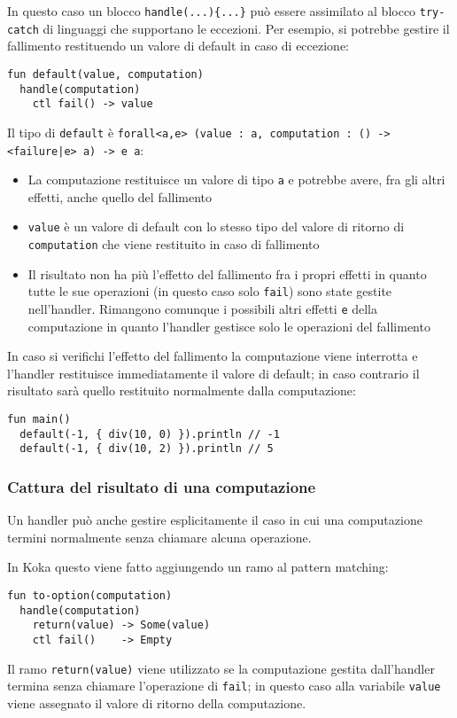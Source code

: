 In questo caso un blocco \lstinline|handle(...){...}| può essere assimilato al blocco \lstinline{try-catch} di linguaggi che supportano le eccezioni.
Per esempio, si potrebbe gestire il fallimento restituendo un valore di default in caso di eccezione:
\begin{lstlisting}[language=koka]
fun default(value, computation)
  handle(computation)
    ctl fail() -> value
\end{lstlisting}
Il tipo di \lstinline{default} è \lstinline{forall<a,e> (value : a, computation : () -> <failure|e> a) -> e a}:
\begin{itemize}
  \item La computazione restituisce un valore di tipo \lstinline{a} e potrebbe avere, fra gli altri effetti, anche quello del fallimento
  \item \lstinline{value} è un valore di default con lo stesso tipo del valore di ritorno di \lstinline{computation} che viene restituito in caso di fallimento
  \item Il risultato non ha più l'effetto del fallimento fra i propri effetti in quanto tutte le sue operazioni (in questo caso solo \lstinline{fail}) sono state gestite nell'handler. Rimangono comunque i possibili altri effetti \lstinline{e} della computazione in quanto l'handler gestisce solo le operazioni del fallimento
\end{itemize}

In caso si verifichi l'effetto del fallimento la computazione viene interrotta e l'handler restituisce immediatamente il valore di default; in caso contrario il risultato sarà quello restituito normalmente dalla computazione:
\begin{lstlisting}[language=koka]
fun main()
  default(-1, { div(10, 0) }).println // -1
  default(-1, { div(10, 2) }).println // 5
\end{lstlisting}

\subsubsection{Cattura del risultato di una computazione}
Un handler può anche gestire esplicitamente il caso in cui una computazione termini normalmente senza chiamare alcuna operazione.

In Koka questo viene fatto aggiungendo un ramo al pattern matching:
\begin{lstlisting}[language=koka]
fun to-option(computation)
  handle(computation)
    return(value) -> Some(value)
    ctl fail()    -> Empty
\end{lstlisting}
Il ramo \lstinline{return(value)} viene utilizzato se la computazione gestita dall'handler termina senza chiamare l'operazione di \lstinline{fail}; in questo caso alla variabile \lstinline{value} viene assegnato il valore di ritorno della computazione.

